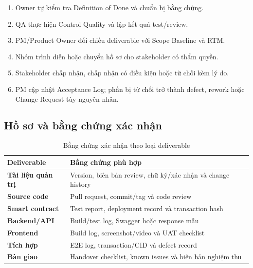 \begin{enumerate}
  \item Owner tự kiểm tra Definition of Done và chuẩn bị bằng chứng.
  \item QA thực hiện Control Quality và lập kết quả test/review.
  \item PM/Product Owner đối chiếu deliverable với Scope Baseline và RTM.
  \item Nhóm trình diễn hoặc chuyển hồ sơ cho stakeholder có thẩm quyền.
  \item Stakeholder chấp nhận, chấp nhận có điều kiện hoặc từ chối kèm lý do.
  \item PM cập nhật Acceptance Log; phần bị từ chối trở thành defect, rework hoặc Change Request tùy nguyên nhân.
\end{enumerate}


\subsection{Hồ sơ và bằng chứng xác nhận}

\begin{table}[H]
\centering
\caption{Bằng chứng xác nhận theo loại deliverable}
\label{tab:acceptance-evidence}
\begin{tabularx}{\textwidth}{| >{\bfseries}p{3.8cm} | X |}
\hline
Deliverable & Bằng chứng phù hợp \\
\hline
Tài liệu quản trị & Version, biên bản review, chữ ký/xác nhận và change history \\ \hline
Source code & Pull request, commit/tag và code review \\ \hline
Smart contract & Test report, deployment record và transaction hash \\ \hline
Backend/API & Build/test log, Swagger hoặc response mẫu \\ \hline
Frontend & Build log, screenshot/video và UAT checklist \\ \hline
Tích hợp & E2E log, transaction/CID và defect record \\ \hline
Bàn giao & Handover checklist, known issues và biên bản nghiệm thu \\
\hline
\end{tabularx}
\end{table}

